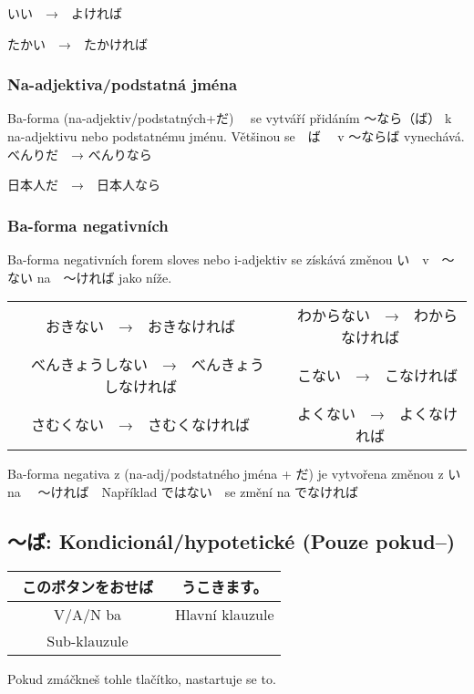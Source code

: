いい　→　よければ

たかい　→　たかければ

\subsubsection{Na-adjektiva/podstatná jména}


Ba-forma (na-adjektiv/podstatných+だ)　 se vytváří přidáním 〜なら（ば） k na-adjektivu nebo podstatnému jménu. Většinou se　ば　 v 〜ならば vynechává.
べんりだ　→ べんりなら

日本人だ　→　日本人なら



\subsubsection{Ba-forma negativních }
Ba-forma negativních forem sloves nebo i-adjektiv se získává změnou い　v　〜ない na　〜ければ jako níže.
\begin{center}
\begin{tabular}{cc}
おきない　→　おきなければ　　　　　&　わからない　→　わからなければ　\\
　べんきょうしない　→　べんきょうしなければ　&　こない　→　こなければ　\\
さむくない　→　さむくなければ　　&　よくない　→　よくなければ　　\\
\end{tabular}
\end{center}


Ba-forma negativa z (na-adj/podstatného jména + だ) je vytvořena změnou z い na 　〜ければ　Například ではない　se změní na でなければ



\subsection{〜ば: Kondicionál/hypotetické (Pouze pokud--)}

\begin{center}
\begin{tabular}{||c||c||}
\hline
このボタンをおせば　&うこきます。\\
\hline
V/A/N ba & Hlavní klauzule\\
\hline
Sub-klauzule&\\
\hline
\end{tabular}
\end{center}
Pokud zmáčkneš tohle tlačítko, nastartuje se to.


